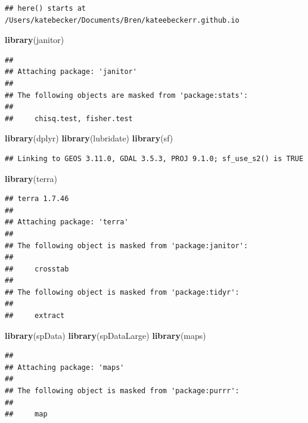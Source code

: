 \documentclass[
]{article}
\newenvironment{Shaded}{\begin{snugshade}}{\end{snugshade}}
\newcommand{\FunctionTok}[1]{\textcolor[rgb]{0.13,0.29,0.53}{\textbf{#1}}}
\newcommand{\NormalTok}[1]{#1}
\begin{document}
\begin{verbatim}
## here() starts at /Users/katebecker/Documents/Bren/kateebeckerr.github.io
\end{verbatim}

\begin{Shaded}
\begin{Highlighting}[]
\FunctionTok{library}\NormalTok{(janitor)}
\end{Highlighting}
\end{Shaded}

\begin{verbatim}
## 
## Attaching package: 'janitor'
## 
## The following objects are masked from 'package:stats':
## 
##     chisq.test, fisher.test
\end{verbatim}

\begin{Shaded}
\begin{Highlighting}[]
\FunctionTok{library}\NormalTok{(dplyr)}
\FunctionTok{library}\NormalTok{(lubridate)}
\FunctionTok{library}\NormalTok{(sf)}
\end{Highlighting}
\end{Shaded}

\begin{verbatim}
## Linking to GEOS 3.11.0, GDAL 3.5.3, PROJ 9.1.0; sf_use_s2() is TRUE
\end{verbatim}

\begin{Shaded}
\begin{Highlighting}[]
\FunctionTok{library}\NormalTok{(terra)}
\end{Highlighting}
\end{Shaded}

\begin{verbatim}
## terra 1.7.46
## 
## Attaching package: 'terra'
## 
## The following object is masked from 'package:janitor':
## 
##     crosstab
## 
## The following object is masked from 'package:tidyr':
## 
##     extract
\end{verbatim}

\begin{Shaded}
\begin{Highlighting}[]
\FunctionTok{library}\NormalTok{(spData)}
\FunctionTok{library}\NormalTok{(spDataLarge)}
\FunctionTok{library}\NormalTok{(maps)}
\end{Highlighting}
\end{Shaded}

\begin{verbatim}
## 
## Attaching package: 'maps'
## 
## The following object is masked from 'package:purrr':
## 
##     map
\end{verbatim}
\end{document}
